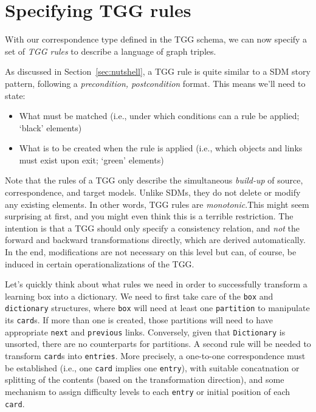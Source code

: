 \newpage
\hypertarget{sec:Rules}{}
\section{Specifying TGG rules}
\genHeader

With our correspondence type defined in the TGG schema, we can now specify a set of \emph{TGG rules} to describe a language of graph
triples.

As discussed in Section~\ref{sec:nutshell}, a TGG rule is quite similar to a SDM story pattern, following a \emph{precondition, postcondition}
format. This means we'll need to state:

\begin{itemize}

\item What must be matched (i.e., under which conditions can a rule be applied; `black' elements)

\item What is to be created when the rule is applied (i.e., which objects and links must exist upon exit; `green' elements)

\end{itemize}

\vspace{0.5cm}

Note that the rules of a TGG only describe the simultaneous \emph{build-up} of source, correspondence, and target models. Unlike SDMs, they do not delete or
modify any existing elements. In other words, TGG rules are \emph{monotonic}.This might seem surprising at first, and you might even think
this is a terrible restriction. The intention is that a TGG should only specify a consistency relation, and \emph{not} the forward and backward transformations
directly, which are derived automatically. In the end, modifications are not necessary on this level but can, of course, be induced in certain
operationalizations of the TGG.

Let's quickly think about what rules we need in order to successfully transform a learning box into a dictionary. We need to first take care of the \texttt{box}
and \texttt{dictionary} structures, where \texttt{box} will need at least one \texttt{partition} to manipulate its \texttt{card}s. If more than one is created,
those partitions will need to have appropriate \texttt{next} and \texttt{previous} links. Conversely, given that \texttt{Dictionary} is unsorted, there are no
counterparts for partitions. A second rule will be needed to transform \texttt{card}s into \texttt{entries}. More precisely, a one-to-one correspondence must be
established (i.e., one \texttt{card} implies one \texttt{entry}), with suitable concatnation or splitting of the contents (based on the transformation
direction), and some mechanism to assign difficulty levels to each \texttt{entry} or initial position of each \texttt{card}.







